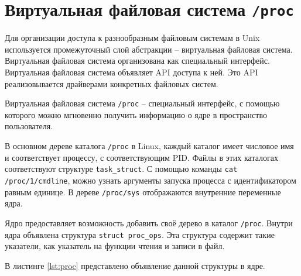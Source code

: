 



\section{Виртуальная файловая система \texttt{/proc}}

Для организации доступа к разнообразным файловым системам в Unix используется промежуточный слой абстракции -- виртуальная файловая система. Виртуальная файловая система организована как специальный интерфейс. Виртуальная файловая система объявляет API доступа к ней. Это API реализовывается драйверами конкретных файловых систем.

Виртуальная файловая система \texttt{/proc} -- специальный интерфейс, с помощью которого можно мгновенно получить информацию о ядре в пространство пользователя.

В основном дереве каталога \texttt{/proc} в Linux, каждый каталог имеет числовое имя и соответствует процессу, с соответствующим PID. Файлы в этих каталогах соответствуют структуре \texttt{task\_struct}. С помощью команды \texttt{cat /proc/1/cmdline}, можно узнать аргументы запуска процесса с идентификатором равным единице. В дереве \texttt{/proc/sys} отображаются внутренние переменные ядра.

Ядро предоставляет возможность добавить своё дерево в каталог \texttt{/proc}. Внутри ядра объявлена структура \texttt{struct proc\_ops}. Эта структура содержит такие указатели, как указатель на функции чтения и записи в файл. 

В листинге \ref{lst:proc} представлено объявление данной структуры в ядре.

